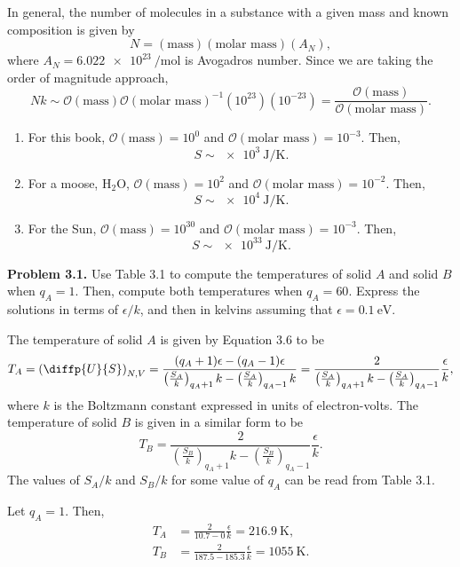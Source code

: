 \documentclass[a4paper, 12pt]{config/homework}
\begin{document}
\noindent
In general, the number of molecules in a substance with a given mass and known composition is given by
\[N = \left(\text{mass}\right)\left(\text{molar mass}\right)\left(A_N\right),\]
where \(A_N=\qty{6.022e23}{\per\mol}\) is Avogadros number. Since we are taking the order of magnitude approach,
\[Nk \sim \mathcal{O}(\text{mass})\mathcal{O}(\text{molar mass})^{-1}\left(10^{23}\right)\left(10^{-23}\right) = \frac{\mathcal{O}(\text{mass})}{\mathcal{O}(\text{molar mass})}.\]
\begin{enumerate}[label=(\roman*)]
\item For this book, \(\mathcal{O}(\text{mass}) = 10^0\) and \(\mathcal{O}(\text{molar mass})=10^{-3}\). Then, \[S\sim\qty{e3}{\joule\per\kelvin}.\]

\item For a moose, \(\text{H}_2\text{O}\), \(\mathcal{O}(\text{mass})=10^2\) and \(\mathcal{O}(\text{molar mass})=10^{-2}\). Then, \[S\sim\qty{e4}{\joule\per\kelvin}.\]

\item For the Sun, \(\mathcal{O}(\text{mass})=10^{30}\) and \(\mathcal{O}(\text{molar mass})=10^{-3}\). Then, \[S\sim\qty{e33}{\joule\per\kelvin}.\]

\end{enumerate}

\pagebreak
\noindent
\textbf{Problem 3.1.} Use Table 3.1 to compute the temperatures of solid \(A\) and solid \(B\) when \(q_A=1\). Then, compute both temperatures when \(q_A=60\). Express the solutions in terms of \(\epsilon/k\), and then in kelvins assuming that \(\epsilon=\qty{0.1}{\eV}\).

\noindent
The temperature of solid \(A\) is given by Equation 3.6 to be
\[T_A = \left(\diffp{U}{S}\right)_{N,V}
= \frac{(q_A + 1)\epsilon - (q_A - 1)\epsilon}{\left(\frac{S_A}{k}\right)_{q_A+1}k - \left(\frac{S_A}{k}\right)_{q_A-1}k}
= \frac{2}{\left(\frac{S_A}{k}\right)_{q_A+1}k - \left(\frac{S_A}{k}\right)_{q_A-1}}\frac{\epsilon}{k},\]
where \(k\) is the Boltzmann constant expressed in units of electron-volts. The temperature of solid \(B\) is given in a similar form to be
\[T_B =\frac{2}{\left(\frac{S_B}{k}\right)_{q_A+1}k - \left(\frac{S_B}{k}\right)_{q_A-1}}\frac{\epsilon}{k}.\]
The values of \(S_A/k\) and \(S_B/k\) for some value of \(q_A\) can be read from Table 3.1.

\noindent
Let \(q_A = 1\). Then,
\begin{align*}
T_A &= \frac{2}{10.7 - 0}\frac{\epsilon}{k} = \qty{216.9}{\kelvin}, \\
T_B &= \frac{2}{187.5-185.3}\frac{\epsilon}{k} = \qty{1055}{\kelvin}.
\end{align*}
\end{document}
